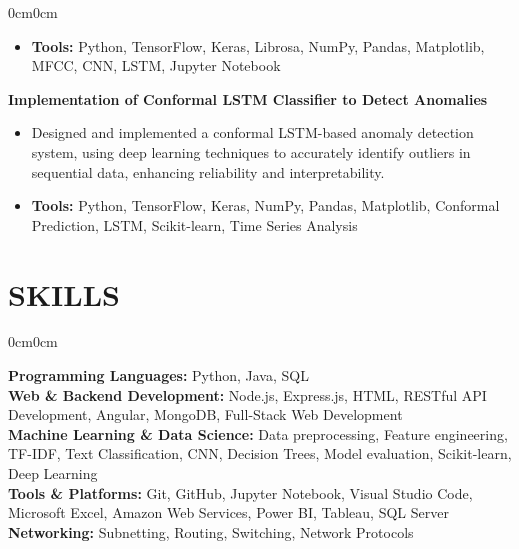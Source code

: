 \documentclass[10pt, letterpaper]{article}
\newenvironment{highlights}{
    \begin{itemize}[
        topsep=0.10cm,
        parsep=0.10cm,
        partopsep=0pt,
        itemsep=0pt,
        leftmargin=10pt
    ]
}{
    \end{itemize}
}
\newenvironment{onecolentry}{
    \begin{adjustwidth}{0cm}{0cm}
}{
    \end{adjustwidth}
}
\newcommand{\placelastupdatedtext}{%
  \AddToShipoutPictureFG*{%
    \put(\LenToUnit{\paperwidth-2cm},\LenToUnit{\paperheight-1.0cm}){%
      \vtop{{\null}\makebox[0pt][c]{%
        \small\color{gray}\textit{Last updated in September 2024}%
      }}}%
  }%
}
\begin{document}
\begin{onecolentry}
\begin{highlights}
            \item \textbf{Tools:} Python, TensorFlow, Keras, Librosa, NumPy, Pandas, Matplotlib, MFCC, CNN, LSTM, Jupyter Notebook
        \end{highlights}
        \vspace{0.2cm}
        \textbf{Implementation of Conformal LSTM Classifier to Detect Anomalies}
        \begin{highlights}
            \item Designed and implemented a conformal LSTM-based anomaly detection system, using deep learning techniques to accurately identify outliers in sequential data, enhancing reliability and interpretability.
            \item \textbf{Tools:} Python, TensorFlow, Keras, NumPy, Pandas, Matplotlib, Conformal Prediction, LSTM, Scikit-learn, Time Series Analysis
        \end{highlights}
        \vspace{0.2cm}
    \end{onecolentry}

       \section{SKILLS}
    \begin{onecolentry}
        \textbf{Programming Languages:} Python, Java, SQL\\
        \textbf{Web \& Backend Development:} Node.js, Express.js, HTML, RESTful API Development, Angular, MongoDB, Full-Stack Web Development\\
        \textbf{Machine Learning \& Data Science:} Data preprocessing, Feature engineering, TF-IDF, Text Classification, CNN, Decision Trees, Model evaluation, Scikit-learn, Deep Learning\\
        \textbf{Tools \& Platforms:} Git, GitHub, Jupyter Notebook, Visual Studio Code, Microsoft Excel, Amazon Web Services, Power BI, Tableau, SQL Server\\
        \textbf{Networking:} Subnetting, Routing, Switching, Network Protocols
    \end{onecolentry}

\end{document}
